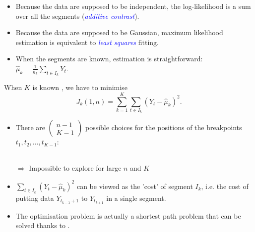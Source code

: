 \documentclass[dvips, lscape]{foils}
\newcommand{\coefbin}[2]{\left( 
    \begin{array}{c} #1 \\ #2 \end{array} 
  \right)}
\newcommand{\textblue}[1]{\textcolor{blue}{#1}}
\newcommand{\emphase}[1]{\textblue{\sl #1}}
\newcommand{\subsection}[1]{
  \addtocounter{subsection}{1}
  {\noindent{\large \textblue{#1}}}
  }
\newcommand{\paragraph}[1]{\noindent{\textblue{#1}}}
\begin{document}
\begin{itemize}
\item Because the data are supposed to be independent, the
log-likelihood is a sum over all the segments (\emphase{additive
contrast}).
\item Because the data are supposed to be Gaussian, maximum likelihood
  estimation is equivalent to \emphase{least squares} fitting.
\item When the segments are known, estimation is straightforward:
  $\widehat{\mu}_k = \frac1{n_k} \sum_{t \in I_k} Y_t$.
\end{itemize}


\newpage
\subsection{How to find the breakpoints?}

When $K$ is known , we have to minimise
$$
J_k(1, n) = \sum_{k=1}^K \sum_{t \in I_k} (Y_t - \widehat{\mu}_k)^2.
$$
\begin{itemize}
\item There are $\coefbin{n-1}{K-1}$ possible choices for the
  positions of the breakpoints $t_1, t_2, \dots, t_{K-1}$: \\
  \\
  \centerline{$\Rightarrow$ Impossible to explore for large
    $n$ and $K$}
\item $\sum_{t \in I_k} (Y_t - \widehat{\mu}_k)^2$ can be viewed as
  the 'cost' of segment $I_k$, i.e. the cost of putting data
  $Y_{t_{k-1}+1}$ to $Y_{t_{k+1}}$ in a single segment.
\item The optimisation problem is actually a shortest path problem
  that can be solved thanks to \paragraph{dynamic programming}.
\end{itemize}
\end{document}
